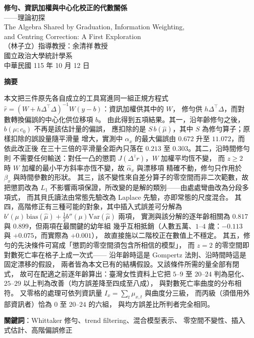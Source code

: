 \documentclass[UTF8, fontset=macnew, a4paper, 12pt]{ctexart}
\begin{document}

\begin{center}
{\bfseries 修勻、資訊加權與中心化校正的代數關係}\\[4pt]
{ ——理論初探}\\[6pt]
{ The Algebra Shared by Graduation, Information Weighting,}\\[2pt]
{ and Centring Correction: A First Exploration}\\[12pt]
{ （林子立）\quad 指導教授：余清祥\,教授}\\[4pt]
{ 國立政治大學統計學系}\\[4pt]
{ 中華民國 115 年 10 月 12 日}
\end{center}

\vspace{6pt}
\begin{center}
\begin{minipage}{0.92\textwidth}
\small
\textbf{摘要}\par\vspace{4pt}
本文把三件原先各自成立的工具寫進同一組正規方程式
$\hat r=(W+h\Delta^{\top}\!\Delta)^{-1}W(y-b)$：資訊加權供其中的 $W$，
修勻供 $h\Delta^{\top}\!\Delta$，而對數轉換偏誤的中心化供位移項 $b$。
由此得到五項結果。其一，沿年齡修勻之後，$b(\mu;c_0)$ 不再是該估計量的偏誤，
應扣除的是 $S\,b(\hat\mu)$，其中 $S$ 為修勻算子；原樣扣除的誤設量隨平滑量
增大，實測中 $\alpha_x$ 的最大偏誤由 $0.672$ 升至 $11.072$，而依此改正後
在三十三倍的平滑量全距內只落在 $0.213$ 至 $0.303$。其二，沿時間修勻則
不需要任何輸送：對任一凸的懲罰 $J(\Delta^{z}r)$，$W$ 加權平均恆不變，
而 $z\ge2$ 時 $W$ 加權的最小平方斜率亦恆不變，故 $\hat\alpha_x$ 與漂移項
精確不動，修勻只作用於 $\beta_x$ 與時間參數的形狀。
其三，該不變性來自差分算子的零空間而非二次範數，故把懲罰改為 $L_1$
不影響兩項保證，所改變的是解的類別——由處處彎曲改為分段多項式，
而其貝氏讀法由常態先驗改為 Laplace 先驗，亦即常態的尺度混合。
其四，高階修正有三種可能的對象，其中插入式誤差可分解為
$b'(\mu)\,\mathrm{bias}(\hat\mu)+\tfrac12 b''(\mu)\mathrm{Var}(\hat\mu)$ 兩項，
實測與該分解的逐年齡相關為 $0.817$ 與 $0.899$，但兩項在最關鍵的幼年組
幾乎互相抵銷（人數五萬、$1$--$4$ 歲：$-0.113$ 與 $+0.075$，而實際為 $+0.001$），
故直接施以二階校正在數值上不穩定。
其五，修勻的先決條件可寫成「懲罰的零空間須包含所相信的模型」，
而 $z=2$ 的零空間即對數死亡率在格子上成一次式——
沿年齡時這是 Gompertz 法則、沿時間時這是固定漂移的假設，
兩者皆為本文已有的結構假設。又該條件所需的量全部有閉式，
故可在配適之前逐年齡算出：臺灣女性資料上它把 $5$--$9$ 至 $20$--$24$ 判為惡化、
$25$--$29$ 以上判為改善（均方誤差降至四成至八成），
與對數死亡率曲度的分布相符。
又零格的處理可依列資訊量 $I_x=\sum_t\mu_{x,t}$ 與曲度分三級，
而丙級（須借用外部資訊者）恰為 $0$ 至 $20$--$24$ 的六組，
與均方誤差比所判者完全相同。
\par\vspace{6pt}
\textbf{關鍵詞}：Whittaker 修勻、trend filtering、混合模型表示、
零空間不變性、插入式估計、高階偏誤修正
\end{minipage}
\end{center}
\end{document}
